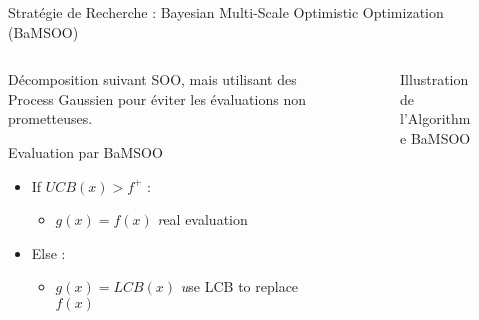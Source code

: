 \begin{frame}{Stratégie de Recherche : Bayesian Multi-Scale Optimistic Optimization (BaMSOO)}
    \begin{columns}
        
        \begin{column}[t]{0.5\textwidth} 
            \vspace*{10pt}
            
            Décomposition suivant SOO, mais utilisant des Process Gaussien pour éviter les évaluations non prometteuses. 
            \begin{block}{Evaluation par BaMSOO}
                \begin{itemize}
                    \item If $UCB(x) > f^+$ :
                    \begin{itemize}
                        \item $g(x) = f(x)$ {\small \textit real evaluation}
                    \end{itemize}
                    \item Else : 
                    \begin{itemize}
                        \item $g(x) = LCB(x)$ {\small \textit use LCB to replace $f(x)$}
                    \end{itemize}
                \end{itemize}
                
            \end{block}
     
            \end{column}
                 
            \begin{column}[t]{0.5\textwidth}
                \begin{figure}
                    \centering
                    
                    \caption{Illustration de l'Algorithme BaMSOO}
                \end{figure} 
            \end{column}
                 
    \end{columns}
\end{frame}

